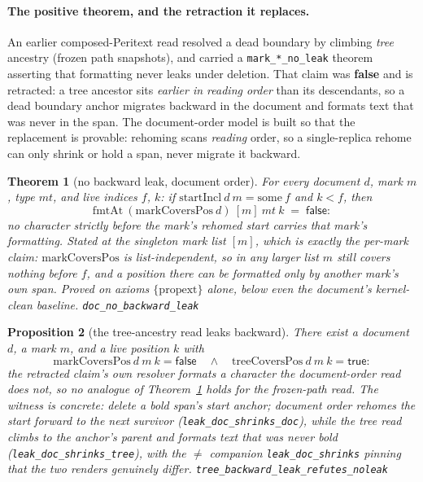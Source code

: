 \documentclass[11pt]{article}
\newtheorem{theorem}{Theorem}[section]
\newtheorem{proposition}[theorem]{Proposition}
\newcommand{\lean}[1]{\texttt{#1}}
\begin{document}
\paragraph{The positive theorem, and the retraction it replaces.} An
earlier composed-Peritext read resolved a dead boundary by climbing
\emph{tree} ancestry (frozen path snapshots), and carried a
\lean{mark\_*\_no\_leak} theorem asserting that formatting never leaks
under deletion. That claim was \textbf{false} and is retracted: a tree
ancestor sits \emph{earlier in reading order} than its descendants, so
a dead boundary anchor migrates backward in the document and formats
text that was never in the span. The document-order model is built so
that the replacement is provable: rehoming scans \emph{reading} order,
so a single-replica rehome can only shrink or hold a span, never
migrate it backward.

\begin{theorem}[no backward leak, document order]
\label{thm:noleak}
For every document $d$, mark $m$, type $\mathit{mt}$, and live
indices $f$, $k$: if $\mathrm{startIncl}\ d\ m = \mathrm{some}\ f$
and $k < f$, then
\[
  \mathrm{fmtAt}\ (\mathrm{markCoversPos}\ d)\ [m]\ \mathit{mt}\ k
  \;=\; \mathsf{false} :
\]
no character strictly before the mark's rehomed start carries that
mark's formatting. Stated at the singleton mark list $[m]$, which is
exactly the per-mark claim: $\mathrm{markCoversPos}$ is
list-independent, so in any larger list $m$ still covers nothing
before $f$, and a position there can be formatted only by
\emph{another} mark's own span. Proved on axioms
$\{\mathrm{propext}\}$ alone, below even the document's kernel-clean
baseline.
\hfill\lean{doc\_no\_backward\_leak}
\end{theorem}

\begin{proposition}[the tree-ancestry read leaks backward]
\label{prop:treeleak}
There exist a document $d$, a mark $m$, and a live position $k$ with
\[
  \mathrm{markCoversPos}\ d\ m\ k = \mathsf{false}
  \quad\wedge\quad
  \mathrm{treeCoversPos}\ d\ m\ k = \mathsf{true} :
\]
the retracted claim's own resolver formats a character the
document-order read does not, so no analogue of
Theorem~\ref{thm:noleak} holds for the frozen-path read. The witness
is concrete: delete a bold span's start anchor; document order
rehomes the start forward to the next survivor
(\lean{leak\_doc\_shrinks\_doc}), while the tree read climbs to the
anchor's parent and formats text that was never bold
(\lean{leak\_doc\_shrinks\_tree}), with the $\ne$ companion
\lean{leak\_doc\_shrinks} pinning that the two renders genuinely
differ.
\hfill\lean{tree\_backward\_leak\_refutes\_noleak}
\end{proposition}
\end{document}
